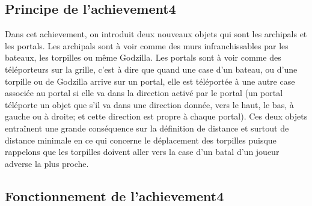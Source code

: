 \subsection{Principe de l’achievement4}

Dans cet achievement, on introduit deux nouveaux objets qui sont les archipals et les portals. Les archipals sont à voir comme des murs infranchissables par les bateaux, les torpilles ou même Godzilla. Les portals sont à voir comme des téléporteurs sur la grille, c'est à dire que quand une case d'un bateau, ou d'une torpille ou de Godzilla arrive sur un portal, elle est téléportée à une autre case associée au portal si elle va dans la direction activé par le portal (un portal téléporte un objet que s'il va dans une direction donnée, vers le haut, le bas, à gauche ou à droite; et cette direction est propre à chaque portal). Ces deux objets entraînent une grande conséquence sur la définition de distance et surtout de distance minimale en ce qui concerne le déplacement des torpilles puisque rappelons que les torpilles doivent aller vers la case d'un batal d'un joueur adverse la plus proche. 

\subsection{Fonctionnement de l'achievement4}

